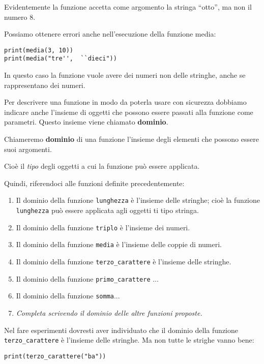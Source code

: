 Evidentemente la funzione accetta come argomento la stringa  ``otto'', ma 
non il numero 8.

Possiamo ottenere errori anche nell'esecuzione della funzione media:

\begin{lstlisting}
print(media(3, 10))
print(media("tre'',  ``dieci"))
\end{lstlisting}

In questo caso la funzione vuole avere dei numeri non delle stringhe, anche 
se rappresentano dei numeri.

Per descrivere una funzione in modo da poterla usare con sicurezza 
dobbiamo indicare anche l'insieme di oggetti che possono essere passati 
alla funzione come parametri. Questo insieme viene chiamato 
\textbf{dominio}.

\begin{definizione}
Chiameremo \textbf{dominio}  di una funzione l'insieme degli elementi che 
possono essere suoi argomenti.
\end{definizione}

Cioè il \emph{tipo} degli oggetti a cui la funzione può essere applicata.

Quindi, riferendoci alle funzioni definite precedentemente:

\begin{enumerate} [noitemsep]
\item Il dominio della funzione \texttt{lunghezza} è l'insieme delle 
stringhe; cioè la funzione \texttt{lunghezza} può essere applicata agli 
oggetti ti tipo stringa.
\item Il dominio della funzione \texttt{triplo} è l'insieme dei numeri.
\item Il dominio della funzione \texttt{media} è l'insieme delle coppie di 
numeri.
\item Il dominio della funzione \texttt{terzo\_carattere} è l'insieme delle 
stringhe.
\item Il dominio della funzione \texttt{primo\_carattere} ...
\item Il dominio della funzione \texttt{somma}...
\item \emph{Completa scrivendo il dominio delle altre funzioni proposte.}
\end{enumerate}

Nel fare esperimenti dovresti aver individuato che il dominio della 
funzione \texttt{terzo\_carattere} è l'insieme delle stringhe. Ma non tutte 
le strighe vanno bene:

\begin{lstlisting}
print(terzo_carattere("ba"))
\end{lstlisting}

